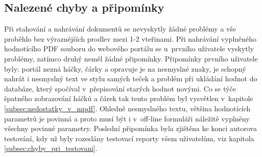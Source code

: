 \subsection{Nalezené chyby a připomínky}
Při stahování a nahrávání dokumentů se nevyskytly žádné problémy a vše proběhlo bez výraznějších prodlev mezi 1-2 vteřinami. Při nahrávání vyplněného hodnotícího PDF souboru do webového portálu se u~prvního uživatele vyskytly problémy, zatímco druhý neměl žádné připomínky. Připomínky prvního uživatele byly: portál nezná háčky, čárky a opravuje je na nesmyslné znaky, je schopný nahrát i nesmyslný text ve stylu samých teček a problém při ukládání hodnot do databáze, který spočíval v~přepisování starých hodnot novými. Co se týče špatného zobrazování háčků a čárek tak tento problém byl vysvětlen v~kapitole \ref{subsec:nedostatky_v_mpdf}. Ohledně nesmyslného textu, většina hodnotících parametrů je povinná a proto musí být i v~off-line formuláři náležitě vyplněny všechny povinné parametry. Poslední připomínka byla zjištěna ke konci autorova testování, kdy už byly rozeslány testovací reporty všem uživatelům, viz kapitola \ref{subsec:chyby_pri_testovani}.  

 